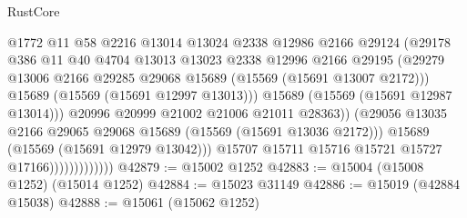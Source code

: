\begin{lexlean}{RustCore}
\begin{coremodule}
                                      @1772
                                      @11
                                      @58
                                      @2216
                                      @13014
                                      @13024
                                      @2338
                                      @12986
                                      @2166
                                      @29124
                                      (@29178
                                        @386
                                        @11
                                        @40
                                        @4704
                                        @13013
                                        @13023
                                        @2338
                                        @12996
                                        @2166
                                        @29195
                                        (@29279
                                          @13006
                                          @2166
                                          @29285
                                          @29068
                                          @15689
                                          (@15569 (@15691 @13007 @2172)))
                                        @15689
                                        (@15569 (@15691 @12997 @13013)))
                                      @15689
                                      (@15569 (@15691 @12987 @13014)))
                                    @20996
                                    @20999
                                    @21002
                                    @21006
                                    @21011
                                    @28363))
                                (@29056
                                  @13035
                                  @2166
                                  @29065
                                  @29068
                                  @15689
                                  (@15569 (@15691 @13036 @2172)))
                                @15689
                                (@15569 (@15691 @12979 @13042)))
                              @15707
                              @15711
                              @15716
                              @15721
                              @15727
                              @17166)))))))))))))
@42879 := @15002 @1252
@42883 := @15004 (@15008 @1252) (@15014 @1252)
@42884 := @15023 @31149
@42886 := @15019 (@42884 @15038)
@42888 := @15061 (@15062 @1252)

\end{coremodule}
\end{lexlean}
